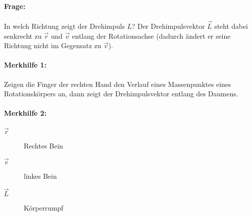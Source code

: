 \documentclass[12pt]{article}
\numberwithin{equation}{subsection}
\begin{document}
	\paragraph{Frage:}
	In welch Richtung zeigt der Drehimpuls $ L $?
	Der Drehimpulsvektor $ \vec{L} $ steht dabei senkrecht zu $ \vec{r} $ und $ \vec{v} $ entlang der Rotationsachse (dadurch ändert er seine Richtung nicht im Gegensatz zu $ \vec{v} $).
	\paragraph{Merkhilfe 1:}
	Zeigen die Finger der rechten Hand den Verlauf eines Massenpunktes eines Rotationskörpers an, dann zeigt der Drehimpulsvektor entlang des Daumens.
	\paragraph{Merkhilfe 2:}
	\begin{description}
		\item[$ \vec{r} $] Rechtes Bein
		\item[$ \vec{v} $] linkes Bein
		\item[$ \vec{L} $] Körperrumpf
	\end{description}
	
\end{document}
